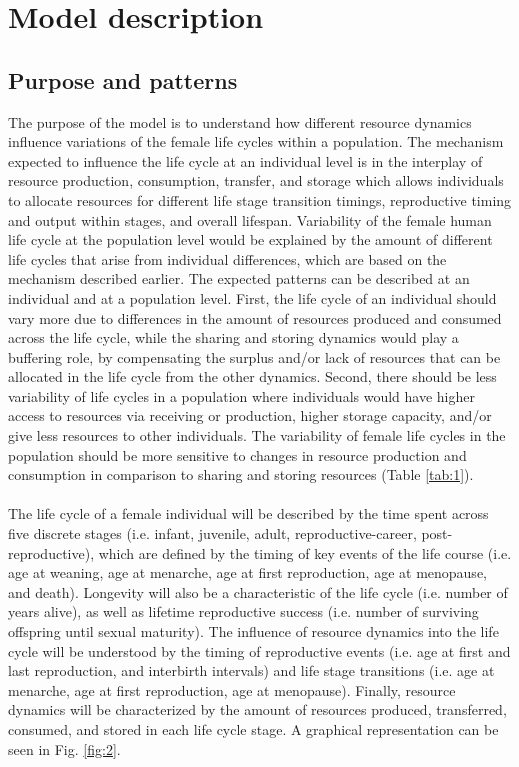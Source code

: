 \documentclass{article}
\begin{document}
\section{Model description}

\subsection{Purpose and patterns}

The purpose of the model is to understand how different resource dynamics influence variations of the female life cycles within a population. The mechanism expected to influence the life cycle at an individual level is in the interplay of resource production, consumption, transfer, and storage which allows individuals to allocate resources for different life stage transition timings, reproductive timing and output within stages, and overall lifespan. Variability of the female human life cycle at the population level would be explained by the amount of different life cycles that arise from individual differences, which are based on the mechanism described earlier. The expected patterns can be described at an individual and at a population level. First, the life cycle of an individual should vary more due to differences in the amount of resources produced and consumed across the life cycle, while the sharing and storing dynamics would play a buffering role, by compensating the surplus and/or lack of resources that can be allocated in the life cycle from the other dynamics. Second, there should be less variability of life cycles in a population where individuals would have higher access to resources via receiving or production, higher storage capacity, and/or give less resources to other individuals. The variability of female life cycles in the population should be more sensitive to changes in resource production and consumption in comparison to sharing and storing resources (Table \ref{tab:1}).
\\\\
The life cycle of a female individual will be described by the time spent across five discrete stages (i.e. infant, juvenile, adult, reproductive-career, post-reproductive), which are defined by the timing of key events of the life course (i.e. age at weaning, age at menarche, age at first reproduction, age at menopause, and death). Longevity will also be a characteristic of the life cycle (i.e. number of years alive), as well as lifetime reproductive success (i.e. number of surviving offspring until sexual maturity). The influence of resource dynamics into the life cycle will be understood by the timing of reproductive events (i.e. age at first and last reproduction, and interbirth intervals) and life stage transitions (i.e. age at menarche, age at first reproduction, age at menopause). Finally, resource dynamics will be characterized by the amount of resources produced, transferred, consumed, and stored in each life cycle stage. A graphical representation can be seen in Fig. \ref{fig:2}.
\end{document}
